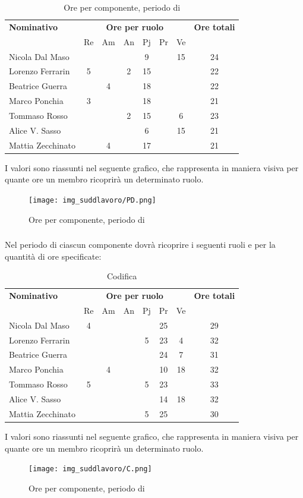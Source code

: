 \begin{table}[H]
	\centering
	\begin{tabular}{|l|c|c|c|c|c|c|c|}
		\hline
		\textbf{Nominativo} & 
		\multicolumn{6}{c|}{\textbf{Ore per ruolo}} & 
		\textbf{Ore totali} \\
		& Re & Am & An & Pj & Pr & Ve & \\
		\hline
		Nicola Dal Maso & & & &9 & &15 & 24 \\
		Lorenzo Ferrarin &5 & &2 &15 & & & 22 \\
		Beatrice Guerra & &4 & &18 & & & 22 \\
		Marco Ponchia &3 & & &18 & & & 21 \\
		Tommaso Rosso & & &2 &15 & &6 & 23 \\
		Alice V. Sasso & & & &6 & &15 & 21 \\
		Mattia Zecchinato & &4 & &17 & & & 21 \\
		\hline
	\end{tabular}
	\caption{Ore per componente, periodo di \PD{}}
\end{table}
I valori sono riassunti nel seguente grafico, che rappresenta in maniera visiva per quante ore un membro ricoprirà un determinato ruolo.
\begin{figure}[H]
	\centering
	\texttt{[image: img\_suddlavoro/PD.png]}
	\caption{Ore per componente, periodo di \PD{}}
\end{figure}

\subsubsection{\Cod}
Nel periodo di \Cod{} ciascun componente dovrà ricoprire i seguenti ruoli e per la quantità di ore specificate:

\begin{table}[H]
	\centering
	\begin{tabular}{|l|c|c|c|c|c|c|c|}
		\hline
		\textbf{Nominativo} & 
		\multicolumn{6}{c|}{\textbf{Ore per ruolo}} & 
		\textbf{Ore totali} \\
		& Re & Am & An & Pj & Pr & Ve & \\
		\hline
		Nicola Dal Maso &4 & & & &25 & & 29 \\
		Lorenzo Ferrarin & & & &5 &23 &4 & 32 \\
		Beatrice Guerra & & & & &24 &7 & 31 \\
		Marco Ponchia & &4 & & &10 &18 & 32 \\
		Tommaso Rosso &5 & & &5 &23 & & 33 \\
		Alice V. Sasso & & & & &14 &18 & 32 \\
		Mattia Zecchinato & & & &5 &25 & & 30 \\
		\hline
	\end{tabular}
	\caption{Codifica}
\end{table}
I valori sono riassunti nel seguente grafico, che rappresenta in maniera visiva per quante ore un membro ricoprirà un determinato ruolo.
\begin{figure}[H]
	\centering
	\texttt{[image: img\_suddlavoro/C.png]}
	\caption{Ore per componente, periodo di \Cod{}}
\end{figure}

